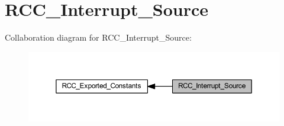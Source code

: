 \hypertarget{group___r_c_c___interrupt___source}{}\section{R\+C\+C\+\_\+\+Interrupt\+\_\+\+Source}
\label{group___r_c_c___interrupt___source}
Collaboration diagram for R\+C\+C\+\_\+\+Interrupt\+\_\+\+Source\+:
\nopagebreak
\begin{figure}[H]
\begin{center}
\leavevmode
\includegraphics[width=350pt]{group___r_c_c___interrupt___source}
\end{center}
\end{figure}
